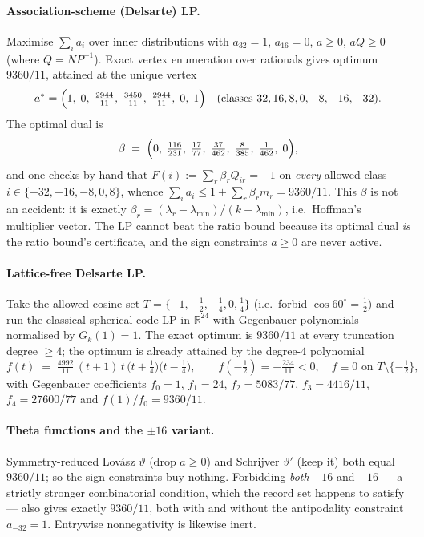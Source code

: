 \documentclass[10pt,a4paper]{article}
\begin{document}
\paragraph{Association-scheme (Delsarte) LP.} Maximise $\sum_i a_i$ over inner distributions with
$a_{32} = 1$, $a_{16} = 0$, $a \ge 0$, $aQ \ge 0$ (where $Q = N P^{-1}$). Exact vertex enumeration
over rationals gives optimum $9360/11$, attained at the unique vertex
\[
  a^{*} = \Bigl(1,\;0,\;\tfrac{2944}{11},\;\tfrac{3450}{11},\;\tfrac{2944}{11},\;0,\;1\Bigr)
  \quad\text{(classes $32,16,8,0,-8,-16,-32$).}
\]
The optimal dual is
\[
  \beta \;=\; \Bigl(0,\;\tfrac{116}{231},\;\tfrac{17}{77},\;\tfrac{37}{462},\;
                    \tfrac{8}{385},\;\tfrac{1}{462},\;0\Bigr),
\]
and one checks by hand that $F(i) := \sum_r \beta_r Q_{ir} = -1$ on \emph{every} allowed class
$i \in \{-32,-16,-8,0,8\}$, whence $\sum_i a_i \le 1 + \sum_r \beta_r m_r = 9360/11$. This $\beta$
is not an accident: it is exactly $\beta_r = (\lambda_r - \lambda_{\min})/(k - \lambda_{\min})$,
i.e.\ Hoffman's multiplier vector. The LP cannot beat the ratio bound because its optimal dual
\emph{is} the ratio bound's certificate, and the sign constraints $a \ge 0$ are never active.

\paragraph{Lattice-free Delsarte LP.} Take the allowed cosine set
$T = \{-1,-\tfrac12,-\tfrac14,0,\tfrac14\}$ (i.e.\ forbid $\cos 60^\circ = \tfrac12$) and run the
classical spherical-code LP in $\mathbb{R}^{24}$ with Gegenbauer polynomials normalised by
$G_k(1) = 1$. The exact optimum is $9360/11$ at every truncation degree $\ge 4$; the optimum is
already attained by the degree-$4$ polynomial
\[
  f(t) \;=\; \tfrac{4992}{11}\,(t+1)\,t\,\bigl(t+\tfrac14\bigr)\bigl(t-\tfrac14\bigr),
  \qquad f(-\tfrac12) = -\tfrac{234}{11} < 0,\quad f \equiv 0 \text{ on } T\setminus\{-\tfrac12\},
\]
with Gegenbauer coefficients $f_0 = 1$, $f_1 = 24$, $f_2 = 5083/77$, $f_3 = 4416/11$,
$f_4 = 27600/77$ and $f(1)/f_0 = 9360/11$.

\paragraph{Theta functions and the $\pm 16$ variant.} Symmetry-reduced Lov\'asz $\vartheta$
(drop $a \ge 0$) and Schrijver $\vartheta'$ (keep it) both equal $9360/11$; so the sign
constraints buy nothing. Forbidding \emph{both} $+16$ and $-16$ --- a strictly stronger
combinatorial condition, which the record set happens to satisfy --- also gives exactly
$9360/11$, both with and without the antipodality constraint $a_{-32} = 1$. Entrywise
nonnegativity is likewise inert.
\end{document}
